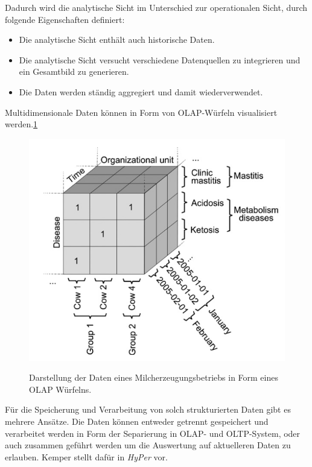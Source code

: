 Dadurch wird die analytische Sicht im Unterschied zur operationalen Sicht, durch folgende Eigenschaften definiert:
\begin{itemize}
	\item Die analytische Sicht enthält auch historische Daten.
	\item Die analytische Sicht versucht verschiedene Datenquellen zu integrieren und ein Gesamtbild zu generieren.
	\item Die Daten werden ständig aggregiert und damit wiederverwendet.
\end{itemize}

Multidimensionale Daten können in Form von OLAP-Würfeln visualisiert werden.\ref{fig:kuehe_olap} 

\begin{figure}[h]
 \includegraphics[scale=0.5,natwidth=\textwidth]{figures/datamodelling/kuehe_olap_wuerfel_schulze2007.png}
 \centering
 \label{fig:kuehe_olap}
 \caption{Darstellung der Daten eines Milcherzeugungsbetriebs in Form eines OLAP Würfelns.\cite{jour:Schulze2007}}
\end{figure}

Für die Speicherung und Verarbeitung von solch strukturierten Daten gibt es mehrere Ansätze. Die Daten können entweder getrennt gespeichert und verarbeitet werden in Form der Separierung in OLAP- und OLTP-System, oder auch zusammen geführt werden um die Auswertung auf aktuelleren Daten zu erlauben. Kemper stellt dafür in \cite{jour:Kemper2011} \textit{HyPer} vor.

